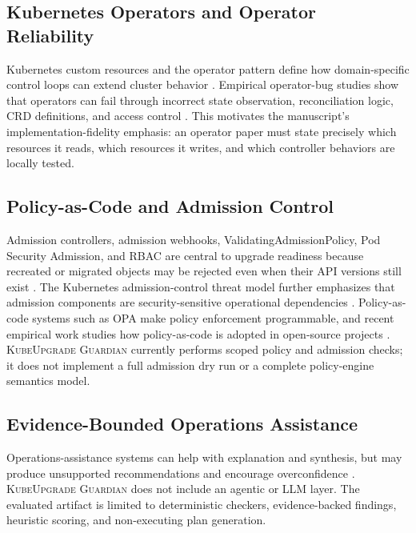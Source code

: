 \documentclass[10pt,journal]{IEEEtran}
\newcommand{\tool}{\textsc{KubeUpgrade Guardian}}
\begin{document}
\subsection{Kubernetes Operators and Operator Reliability}
Kubernetes custom resources and the operator pattern define how domain-specific control loops can extend cluster behavior \cite{kubernetesCustomResources,kubernetesOperatorPattern,cncfOperatorWhitepaper}. Empirical operator-bug studies show that operators can fail through incorrect state observation, reconciliation logic, CRD definitions, and access control \cite{xu2024operatorbugs}. This motivates the manuscript's implementation-fidelity emphasis: an operator paper must state precisely which resources it reads, which resources it writes, and which controller behaviors are locally tested.

\subsection{Policy-as-Code and Admission Control}
Admission controllers, admission webhooks, ValidatingAdmissionPolicy, Pod Security Admission, and RBAC are central to upgrade readiness because recreated or migrated objects may be rejected even when their API versions still exist \cite{kubernetesAdmissionControllers,kubernetesAdmissionWebhooks,kubernetesValidatingAdmissionPolicy,kubernetesPodSecurityAdmission,kubernetesRbac,kubernetesRbacGoodPractices}. The Kubernetes admission-control threat model further emphasizes that admission components are security-sensitive operational dependencies \cite{kubernetesAdmissionThreatModel}. Policy-as-code systems such as OPA make policy enforcement programmable, and recent empirical work studies how policy-as-code is adopted in open-source projects \cite{opa,policyAsCodeAdoption2026}. \tool{} currently performs scoped policy and admission checks; it does not implement a full admission dry run or a complete policy-engine semantics model.

\subsection{Evidence-Bounded Operations Assistance}
Operations-assistance systems can help with explanation and synthesis, but may produce unsupported recommendations and encourage overconfidence \cite{hou2024,perry2023,iacDriftAgents2025}. \tool{} does not include an agentic or LLM layer. The evaluated artifact is limited to deterministic checkers, evidence-backed findings, heuristic scoring, and non-executing plan generation.
\end{document}
